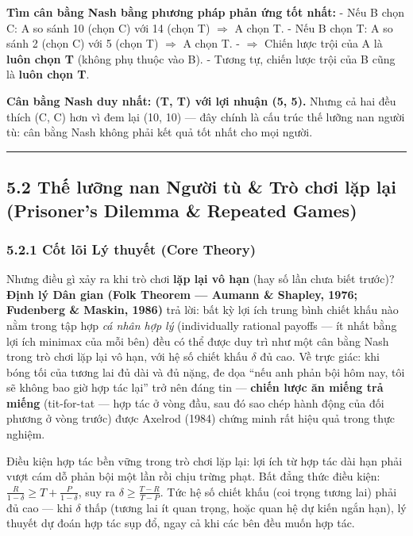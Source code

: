 \documentclass[
]{article}
\begin{document}
\textbf{Tìm cân bằng Nash bằng phương pháp phản ứng tốt nhất:} - Nếu B
chọn C: A so sánh 10 (chọn C) với 14 (chọn T) \(\Rightarrow\) A chọn T.
- Nếu B chọn T: A so sánh 2 (chọn C) với 5 (chọn T) \(\Rightarrow\) A
chọn T. - \(\Rightarrow\) Chiến lược trội của A là \textbf{luôn chọn T}
(không phụ thuộc vào B). - Tương tự, chiến lược trội của B cũng là
\textbf{luôn chọn T}.

\textbf{Cân bằng Nash duy nhất: (T, T) với lợi nhuận (5, 5).} Nhưng cả
hai đều thích (C, C) hơn vì đem lại (10, 10) --- đây chính là cấu trúc
thế lưỡng nan người tù: cân bằng Nash không phải kết quả tốt nhất cho
mọi người.

\begin{center}\rule{0.5\linewidth}{0.5pt}\end{center}

\subsection{5.2 Thế lưỡng nan Người tù \& Trò chơi lặp lại (Prisoner's
Dilemma \& Repeated
Games)}\label{thux1ebf-lux1b0ux1ee1ng-nan-ngux1b0ux1eddi-tuxf9-truxf2-chux1a1i-lux1eb7p-lux1ea1i-prisoners-dilemma-repeated-games}

\subsubsection{5.2.1 Cốt lõi Lý thuyết (Core
Theory)}\label{cux1ed1t-luxf5i-luxfd-thuyux1ebft-core-theory-2}

Nhưng điều gì xảy ra khi trò chơi \textbf{lặp lại vô hạn} (hay số lần
chưa biết trước)? \textbf{Định lý Dân gian (Folk Theorem --- Aumann \&
Shapley, 1976; Fudenberg \& Maskin, 1986)} trả lời: bất kỳ lợi ích trung
bình chiết khấu nào nằm trong tập hợp \emph{cá nhân hợp lý}
(individually rational payoffs --- ít nhất bằng lợi ích minimax của mỗi
bên) đều có thể được duy trì như một cân bằng Nash trong trò chơi lặp
lại vô hạn, với hệ số chiết khấu \(\delta\) đủ cao. Về trực giác: khi
bóng tối của tương lai đủ dài và đủ nặng, đe dọa ``nếu anh phản bội hôm
nay, tôi sẽ không bao giờ hợp tác lại'' trở nên đáng tin ---
\textbf{chiến lược ăn miếng trả miếng} (tit-for-tat --- hợp tác ở vòng
đầu, sau đó sao chép hành động của đối phương ở vòng trước) được Axelrod
(1984) chứng minh rất hiệu quả trong thực nghiệm.

Điều kiện hợp tác bền vững trong trò chơi lặp lại: lợi ích từ hợp tác
dài hạn phải vượt cám dỗ phản bội một lần rồi chịu trừng phạt. Bất đẳng
thức điều kiện: \(\frac{R}{1-\delta} \ge T + \frac{P}{1-\delta}\), suy
ra \(\delta \ge \frac{T-R}{T-P}\). Tức hệ số chiết khấu (coi trọng tương
lai) phải đủ cao --- khi \(\delta\) thấp (tương lai ít quan trọng, hoặc
quan hệ dự kiến ngắn hạn), lý thuyết dự đoán hợp tác sụp đổ, ngay cả khi
các bên đều muốn hợp tác.
\end{document}
